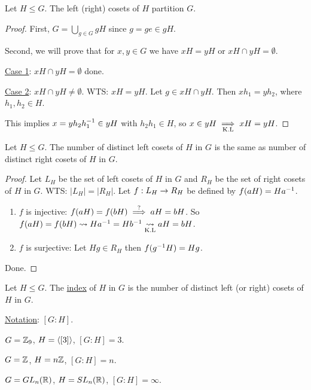 \documentclass[]{article}
\begin{document}
\begin{theorem}
	Let $H\leq G$. The left (right) cosets of $H$ partition $G$.
\end{theorem}
\begin{proof}
	First, $G = \bigcup_{g\in G} gH$ since $g = ge\in gH$.
	
	Second, we will prove that for $x,y\in G$ we have $xH = yH$ or $xH\cap yH = \emptyset$.
	
	\ul{Case 1}: $xH\cap yH = \emptyset$ done.
	
	\ul{Case 2}: $xH\cap yH \neq \emptyset$. WTS: $xH = yH$.
	Let $g\in xH\cap yH$. Then $xh_1 = yh_2$, where $h_1,h_2\in H$.
	
	This implies $x = y h_2 h_1^{-1}\in yH$ with $h_2 h_1\in H$, so $x\in yH \underset{\text{K.L}}{\implies} xH = yH$.
\end{proof}

\begin{theorem}
	Let $H\leq G$. The number of distinct left cosets of $H$ in $G$ is the same as number of distinct right cosets of $H$ in $G$.
\end{theorem}
\begin{proof}
	Let $L_H$ be the set of left cosets of $H$ in $G$ and $R_H$ be the set of right cosets of $H$ in $G$.
	WTS: $|L_H| = |R_H|$.
	Let $f: L_H\rightarrow R_H$ be defined by $f(aH) = Ha^{-1}$.
	\begin{enumerate}
		\item $f$ is injective: $f(aH) = f(bH) \overset{?}{\implies} aH = bH$. So $f(aH) = f(bH) \rightsquigarrow Ha^{-1} = Hb^{-1} \underset{\text{K.L}}{\rightsquigarrow} aH = bH$.
		\item $f$ is surjective: Let $Hg\in R_H$ then $f(g^{-1} H) = Hg$.
	\end{enumerate}
	Done.
\end{proof}

\begin{definition}
	Let $H\leq G$. The \ul{index} of $H$ in $G$ is the number of distinct left (or right) cosets of $H$ in $G$.
\end{definition}
\ul{Notation}: $[G:H]$.
\begin{example}
	$G = \mathbb{Z}_9$, $H =\langle [3] \rangle$, $[G:H] = 3$.
\end{example}
\begin{example}
	$G = \mathbb{Z}$, $H = n\mathbb{Z}$, $[G:H] = n$.
\end{example}
\begin{example}
	$G = GL_n(\mathbb{R})$, $H = SL_n(\mathbb{R})$, $[G:H] = \infty$.
\end{example}
\end{document}
